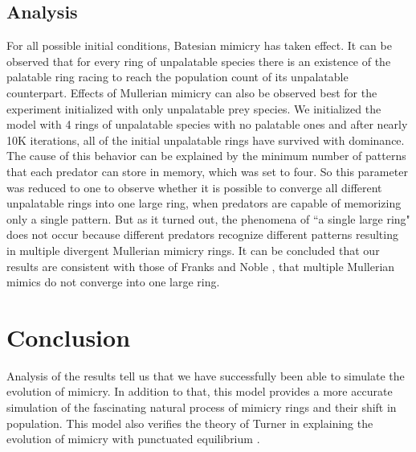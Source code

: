 \documentclass[letterpaper]{article}
\numberwithin{equation}{section}
\begin{document}
\subsection{Analysis}
For all possible initial conditions, Batesian mimicry has taken effect. It can be observed that for every ring of unpalatable species there is an existence of the palatable ring racing to reach the population count of its unpalatable counterpart. Effects of Mullerian mimicry can also be observed best for the experiment initialized with only unpalatable prey species. We initialized the model with 4 rings of unpalatable species with no palatable ones and after nearly 10K iterations, all of the initial unpalatable rings have survived with dominance. The cause of this behavior can be explained by the minimum number of patterns that each predator can store in memory, which was set to four. So this parameter was reduced to one to observe whether it is possible to converge all different unpalatable rings into one large ring, when predators are capable of memorizing only a single pattern. But as it turned out, the phenomena of ``a single large ring" does not occur because different predators recognize different patterns resulting in multiple divergent Mullerian mimicry rings. It can be concluded that our results are consistent with those of Franks and Noble \citep{franks2003}, that multiple Mullerian mimics do not converge into one large ring.

\section{Conclusion}
\label{section:conclusion}
Analysis of the results tell us that we have successfully been able to simulate the evolution of mimicry. In addition to that, this model provides a more accurate simulation of the fascinating natural process of mimicry rings and their shift in population. This model also verifies the theory of Turner in explaining the evolution of mimicry with punctuated equilibrium \citep{turner1988}.




\printglossaries
{} \label{acronyms}
\end{document}
